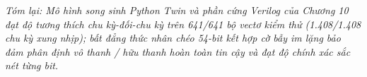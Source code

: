 \textit{Tóm lại: Mô hình song sinh Python Twin và phần cứng Verilog của Chương 10 đạt độ tương thích chu kỳ-đối-chu kỳ trên 641/641 bộ vectơ kiểm thử (1.408/1.408 chu kỳ xung nhịp); bất đẳng thức nhân chéo 54-bit kết hợp cờ bẫy im lặng bảo đảm phân định vô thanh / hữu thanh hoàn toàn tin cậy và đạt độ chính xác sắc nét từng bit.}
